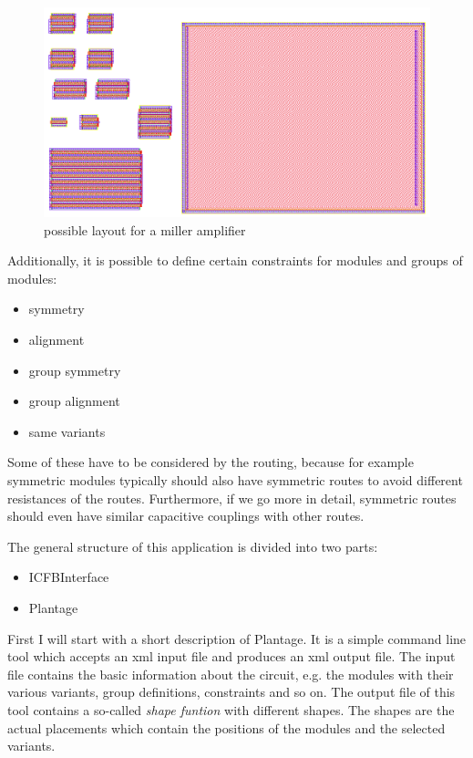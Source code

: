 \begin{figure}
	\centering
	\includegraphics[scale=0.4]{FIG/miller_amplifier_layout.png}
	\caption{possible layout for a miller amplifier}
	\label{fig:miller_amplifier_layout}
\end{figure}

Additionally, it is possible to define certain constraints for modules and groups of modules:

\begin{itemize}
\item symmetry
\item alignment
\item group symmetry
\item group alignment
\item same variants
\end{itemize}

Some of these have to be considered by the routing, because for example symmetric modules typically should also have symmetric routes to avoid different resistances of the routes. Furthermore, if we go more in detail, symmetric routes should even have similar capacitive couplings with other routes.

The general structure of this application is divided into two parts:
\begin{itemize}
\item ICFBInterface
\item Plantage
\end{itemize}

First I will start with a short description of Plantage. It is a simple command line tool which accepts an xml input file and produces an xml output file. The input file contains the basic information about the circuit, e.g. the modules with their various variants, group definitions, constraints and so on. The output file of this tool contains a so-called \emph{shape funtion} with different shapes. The shapes are the actual placements which contain the positions of the modules and the selected variants.

